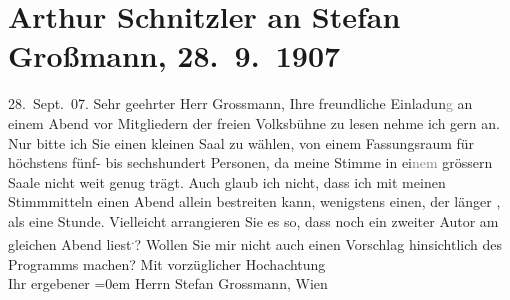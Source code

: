 

         
         \renewcommand{\erwaehntePersonen}{Personen: Stefan Großmann}
         \renewcommand{\erwaehnteInstitutionen}{Institutionen: Wiener Freie Volksbühne}
         \renewcommand{\erwaehnteOrte}{Orte: Wien}
         \renewcommand{\erwaehnteWerke}{}
               \section[Arthur Schnitzler an Stefan Großmann, 28. 9. 1907]{ Arthur Schnitzler an Stefan Großmann, 28. 9. 1907}\nopagebreak{}\rehead{ }\begin{ledgroupsized}[t]{13cm}\normalsize\beginnumbering \toendnotes[C]{\smallbreak\pagebreak[2]} 
\toendnotes[C]{\smallbreak}\pstart
           \raggedleft{}{\pb}28. Sept. 07. \pend
           \pstart{}Sehr geehrter Herr Grossmann,\pend\pstart
           Ihre freundliche Einladun\textcolor{gray}{g} an einem Abend vor Mitgliedern der freien Volksbühne zu lesen nehme ich gern an. Nur
               bitte ich Sie einen kleinen Saal zu wählen, von einem Fassungsraum für höchstens
               fünf- bis sechshundert Personen, da meine Stimme in ei\textcolor{gray}{nem} grössern
               Saale nicht weit genug trägt. Auch glaub ich nicht, dass ich mit meinen Stimmmitteln
               einen Abend allein bestreiten kann, wenigstens einen, der länger \label{T_L01712_1v}\label{T_L01712_1h}, als eine Stunde. Vielleicht
               arrangieren Sie es so, dass noch ein zweiter Autor am gleichen Abend liest\substVorne{}\textsuperscript{.}\substDazwischen{}?\substHinten{} Wollen Sie mir nicht auch einen Vorschlag hinsichtlich des Programms
               machen?\pend
           \pstart
           Mit vorzüglicher Hochachtung{\\[\baselineskip]}Ihr ergebener\pend
           \leftskip=0em{}{\bigskip}\pstart
           \noindent{}Herrn Stefan Grossmann, Wien\pend
           
         
         \endnumbering{}\end{ledgroupsized}  \newcommand{\dateiname}{L01712}\newcommand{\titel}{Arthur Schnitzler an Stefan Großmann, 28. 9. 1907}\newcommand{\editorInnen}{Martin Anton Müller und Gerd-Hermann Susen}
      